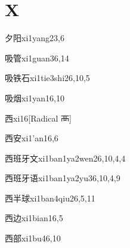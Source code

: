 
\section*{X}

\begin{entry}{夕阳}{xi1yang2}{3,6}
\end{entry}

\begin{entry}{吸管}{xi1guan3}{6,14}
\end{entry}

\begin{entry}{吸铁石}{xi1tie3shi2}{6,10,5}
\end{entry}

\begin{entry}{吸烟}{xi1yan1}{6,10}
\end{entry}

\begin{entry}{西}{xi1}{6}[Radical 襾]
\end{entry}

\begin{entry}{西安}{xi1'an1}{6,6}
\end{entry}

\begin{entry}{西班牙文}{xi1ban1ya2wen2}{6,10,4,4}
\end{entry}

\begin{entry}{西班牙语}{xi1ban1ya2yu3}{6,10,4,9}
\end{entry}

\begin{entry}{西半球}{xi1ban4qiu2}{6,5,11}
\end{entry}

\begin{entry}{西边}{xi1bian1}{6,5}
\end{entry}

\begin{entry}{西部}{xi1bu4}{6,10}
\end{entry}

